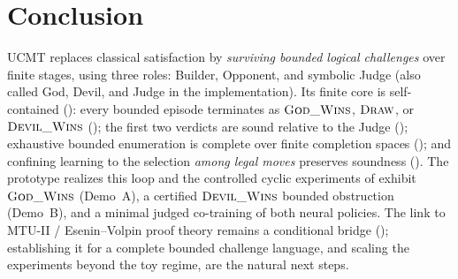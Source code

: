 \documentclass[11pt]{article}
\theoremstyle{definition}
\theoremstyle{plain}
\begin{document}
\section{Conclusion}

UCMT replaces classical satisfaction by \emph{surviving bounded logical challenges} over finite stages, using three roles: Builder, Opponent, and symbolic Judge (also called God, Devil, and Judge in the implementation). Its
finite core is self-contained (): every bounded episode terminates as
$\textsc{God\_Wins}$, $\textsc{Draw}$, or $\textsc{Devil\_Wins}$ (); the first
two verdicts are sound relative to the Judge (); exhaustive bounded
enumeration is complete over finite completion spaces (); and confining learning to
the selection \emph{among legal moves} preserves soundness (). The prototype
realizes this loop and the controlled cyclic experiments of  exhibit
$\textsc{God\_Wins}$ (Demo~A), a certified $\textsc{Devil\_Wins}$ bounded obstruction (Demo~B), and a
minimal judged co-training of both neural policies. The link to MTU-II / Esenin--Volpin proof theory
remains a conditional bridge (); establishing it for a complete bounded challenge
language, and scaling the experiments beyond the toy regime, are the natural next steps.

\nocite{*}


\end{document}
